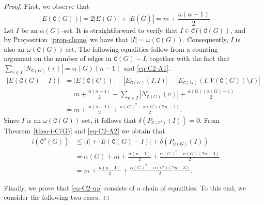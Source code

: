 \documentclass[10pt,a4paper]{amsart}
\begin{document}
\begin{proof}
First, we observe that 
\begin{equation}\label{eq-C2-A1}
|E(\mathtt{C}(G))| = 2|E(G)| + |E(\overline{G})| = m + \frac{n(n-1)}{2}.
\end{equation}
Let $I$ be an $\alpha(G)$-set. It is straightforward to verify that $I \in \mathcal{C}l (\mathtt{C}(G))$, and by Proposition~\ref{prop-clique} we have that $|I|=\omega(\mathtt{C}(G))$. Consequently, $I$ is also an $\omega(\mathtt{C}(G))$-set.  The following equalities follow from a counting argument on the number of edges in $\mathtt{C}(G)-I$, together with the fact that $\sum_{v\in I} |N_{\mathtt{C}(G)} (v)| = \alpha(G) (n-1)$ and \eqref{eq-C2-A1}.
\begin{equation}\label{eq-C2-A2}
\begin{split}
|E(\mathtt{C}(G)-I)| &= |E(\mathtt{C}(G))| -  |E_{\mathtt{C}(G)} (I,I)| - |E_{\mathtt{C}(G)} (I, V(\mathtt{C}(G)) \setminus I)| \\[5pt]
&= m + \frac{n(n-1)}{2} - \sum_{v\in I} |N_{\mathtt{C}(G)} (v)| + \frac{\alpha(G)(\alpha(G)-1)}{2} \\[5pt]
&= m + \frac{n(n-1)}{2} + \frac{\alpha(G)^{2} -\alpha(G) (2n-1)}{2}.
\end{split}
\end{equation}
Since $I$ is an $\omega(\mathtt{C}(G))$-set, it follows that $\delta(P_{\mathtt{C}(G)}(I)) = 0$. From Theorem~\ref{theo-i-C(G)} and \eqref{eq-C2-A2} we obtain that
\begin{equation}\label{eq-C2-up}
\begin{split}
i (\mathtt{C}^{2}(G)) &\leq |I| + |E(\mathtt{C}(G)-I)| + \delta(P_{\mathtt{C}(G)}(I)) \\[5pt]
&= \alpha (G) + m + \frac{n(n-1)}{2} + \frac{\alpha(G)^{2} -\alpha(G) (2n-1)}{2}\\[5pt]
&= m + \frac{n(n-1)}{2} + \frac{\alpha(G)^{2} -\alpha(G) (2n-3)}{2}.
\end{split}
\end{equation}

\vspace{.2cm}

\noindent
Finally, we prove that \eqref{eq-C2-up} consists of a chain of equalities. To this end, we consider the following two cases.

\vspace{.2cm}


\end{proof}
\end{document}
